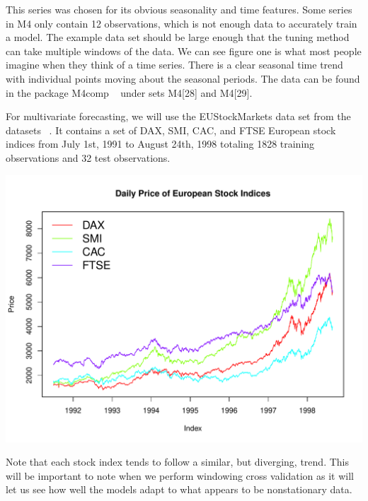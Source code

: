 \documentclass{article}\usepackage[]{graphicx}\usepackage[]{color}
\makeatletter
\def\maxwidth{ %
  \ifdim\Gin@nat@width>\linewidth
    \linewidth
  \else
    \Gin@nat@width
  \fi
}
\newenvironment{knitrout}{}{} %
\theoremstyle{definition}
\newcommand\code{\@codex}
\def\@codex#1{{\normalfont\ttfamily\hyphenchar\font=-1 #1}}
\newcommand{\pkg}[1]{{\fontseries{b}\selectfont #1}}
\makeatother
\begin{document}
This series was chosen for its obvious seasonality and time features. Some series in M4 only contain 12 observations, which is not enough data to accurately train a model. The example data set should be large enough that the tuning method can take multiple windows of the data. We can see figure one is what most people imagine when they think of a time series. There is a clear seasonal time trend with individual points moving about the seasonal periods. The data can be found in the package \pkg{M4comp} ~\cite{m4comp} under sets \code{M4[28]} and \code{M4[29]}. 

For multivariate forecasting, we will use the EUStockMarkets data set from the \pkg{datasets} ~\cite{datasets}. It contains a set of DAX, SMI, CAC, and FTSE European stock indices from July 1st, 1991 to August 24th, 1998 totaling 1828 training observations and 32 test observations.

\begin{knitrout}
\color{fgcolor}

{\centering \includegraphics[width=\maxwidth]{figure/get_dat_stocks-1} 

}



\end{knitrout}

Note that each stock index tends to follow a similar, but diverging, trend. This will be important to note when we perform windowing cross validation as it will let us see how well the models adapt to what appears to be nonstationary data.
\end{document}
